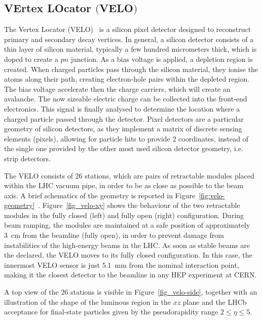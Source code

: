 \subsection[VErtex LOcator]{VErtex LOcator $\bigl($VELO$\bigr)$}\label{sec:velo}
The Vertex Locator (VELO)~\cite{Bediaga:2013tje} is a silicon pixel detector designed to reconstruct primary and secondary decay vertices. In general, a silicon detector consists of a thin layer of silicon material, typically a few hundred micrometers thick, which is doped to create a $pn$ junction. As a bias voltage is applied, a depletion region is created. When charged particles pass through the silicon material, they ionise the atoms along their path, creating electron-hole pairs within the depleted region. The bias voltage accelerate then the charge carriers, which will create an avalanche. The now sizeable electric charge can be collected into the front-end electronics.  This signal is finally analysed to determine the location where a charged particle passed through the detector. Pixel detectors are a particular geometry of silicon detectors, as they implement a matrix of discrete sensing elements (pixels), allowing for particle hits to provide 2 coordinates, instead of the single one provided by the other most used silicon detector geometry, i.e. strip detectors. 

The VELO consists of 26 stations, which are pairs of retractable modules placed within the LHC vacuum pipe, in order to be as close as possible to the beam axis. 
A brief schematics of the geometry is reported in Figure~\ref{fig:velo-geometry}~\cite{LHCbVelo:2019flq}. Figure~\ref{fig_velo-xy} shows the behaviour of the two retractable modules in the fully closed (left) and fully open (right) configuration. During beam ramping, the modules are maintained at a safe position of approximately \SI{3}{\centi\meter} from the beamline (fully open), in order to prevent damage from instabilities of the high-energy beams in the LHC. As soon as stable beams are the declared, the VELO moves to its fully closed configuration. In this case, the innermost VELO sensor is just \SI{5.1}{\milli\meter} from the nominal interaction point, making it the closest detector to the beamline in any HEP experiment at CERN. 

A top view of the 26 stations is visible in Figure~\ref{fig_velo-side}, together with an illustration of the shape of the luminous region in the $xz$ plane and the LHCb acceptance for final-state particles given by the pseudorapidity range $2 \leq \eta \leq 5$. 

